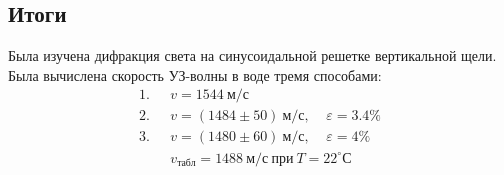\documentclass{lab}
\begin{document}
\subsection*{Итоги}
Была изучена дифракция света на синусоидальной решетке вертикальной щели.\\

Была вычислена скорость УЗ-волны в воде тремя способами:
\begin{equation}
\begin{aligned}
1. ~~~ &v = 1544~м/с \\
2. ~~~ &v = (1484 \pm 50)~м/с, ~~~~~ \varepsilon = 3.4 \% \\
3. ~~~ &v = (1480 \pm 60)~м/с, ~~~~~ \varepsilon = 4   \% \\
&v_{табл} = 1488~м/с~при~T = 22^{\circ}С
\end{aligned}
\end{equation}
\end{document}
